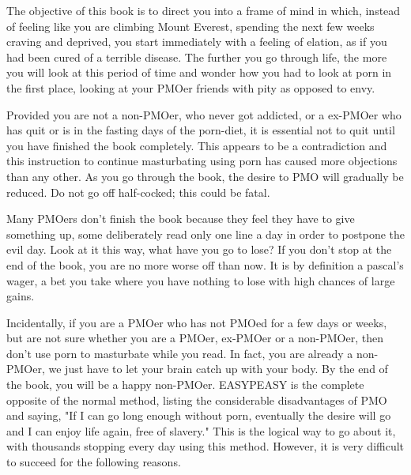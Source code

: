 \documentclass[easypeasy.tex]{subfiles}
\begin{document}
The objective of this book is to direct you into a frame of mind in which, instead of feeling like you are climbing Mount Everest, spending the next few weeks craving and deprived, you start immediately with a feeling of elation, as if you had been cured of a terrible disease. The further you go through life, the more you will look at this period of time and wonder how you had to look at porn in the first place, looking at your PMOer friends with pity as opposed to envy.

Provided you are not a non-PMOer, who never got addicted, or a ex-PMOer who has quit or is in the fasting days of the porn-diet, it is essential not to quit until you have finished the book completely. This appears to be a contradiction and this instruction to continue masturbating using porn has caused more objections than any other. As you go through the book, the desire to PMO will gradually be reduced. Do not go off half-cocked; this could be fatal.

Many PMOers don't finish the book because they feel they have to give something up, some deliberately read only one line a day in order to postpone the evil day. Look at it this way, what have you go to lose? If you don't stop at the end of the book, you are no more worse off than now. It is by definition a pascal's wager, a bet you take where you have nothing to lose with high chances of large gains.

Incidentally, if you are a PMOer who has not PMOed for a few days or weeks, but are not sure whether you are a PMOer, ex-PMOer or a non-PMOer, then don't use porn to masturbate while you read. In fact, you are already a non-PMOer, we just have to let your brain catch up with your body. By the end of the book, you will be a happy non-PMOer. EASYPEASY is the complete opposite of the normal method, listing the considerable disadvantages of PMO and saying,
"If I can go long enough without porn, eventually the desire will go and I can enjoy life again, free of slavery."
This is the logical way to go about it, with thousands stopping every day using this method. However, it is very difficult to succeed for the following reasons.
\end{document}
